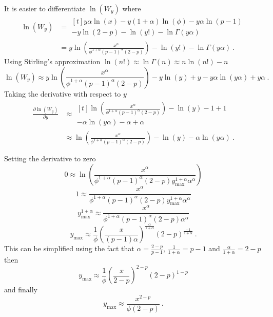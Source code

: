 It is easier to differentiate $\ln(W_y)$ where
\begin{align}
  \ln(W_y) &= 
  \begin{multlined}[t]
    y\alpha\ln(x)-y(1+\alpha)\ln(\phi)-y\alpha\ln(p-1)\\-y\ln(2-p)-\ln(y!)-\ln\Gamma(y\alpha)
  \end{multlined}
  \nonumber\\
  &=
  y
  \ln\left(
    \frac{x^\alpha}{\phi^{1+\alpha}(p-1)^\alpha(2-p)}
  \right)
  -\ln(y!)-\ln\Gamma(y\alpha)
  \ .
\end{align}
Using Stirling's approximation $\ln(n!)\approx\ln\Gamma(n)\approx n\ln(n!)-n$
\begin{equation}
  \ln(W_y) \approx
  y\ln\left(
    \frac{x^\alpha}{\phi^{1+\alpha}(p-1)^\alpha(2-p)}
  \right)
  -y\ln(y)+y-y\alpha\ln(y\alpha) + y\alpha
  \ .
\end{equation}
Taking the derivative with respect to $y$
\begin{align*}
  \frac{\partial \ln(W_y)}{\partial y} &\approx
  \begin{multlined}[t]
    \ln\left(
      \frac{x^\alpha}{\phi^{1+\alpha}(p-1)^\alpha(2-p)}
    \right)
    -\ln(y)-1+1
    \\
    -\alpha\ln(y\alpha)-\alpha+\alpha
  \end{multlined}
  \\
  &\approx
  \ln\left(
    \frac{x^\alpha}{\phi^{1+\alpha}(p-1)^\alpha(2-p)}
  \right)
  -\ln(y)
  -\alpha\ln(y\alpha)
  \ .
\end{align*}

Setting the derivative to zero
\begin{equation*}
  0 \approx \ln\left(
    \frac{
      x^\alpha
    }
    {
      \phi^{1+\alpha}(p-1)^\alpha(2-p)y_{\text{max}}^{1+\alpha}\alpha^\alpha
    }
  \right)
\end{equation*}
\begin{equation*}
  1 \approx 
  \frac{x^\alpha}{\phi^{1+\alpha}(p-1)^\alpha(2-p)y_{\text{max}}^{1+\alpha}\alpha^\alpha}
\end{equation*}
\begin{equation*}
  y_{\text{max}}^{1+\alpha} \approx 
  \frac{x^\alpha}{\phi^{1+\alpha}(p-1)^\alpha(2-p)\alpha^\alpha}
\end{equation*}
\begin{equation*}
  y_{\text{max}} \approx 
  \frac{1}{\phi}
  \left(
    \frac{x}{(p-1)\alpha}
  \right)^{\frac{\alpha}{1+\alpha}}
  (2-p)^{\frac{-1}{1+\alpha}}
  \ .
\end{equation*}
This can be simplified using the fact that $\alpha=\frac{2-p}{p-1}$, $\frac{1}{1+\alpha} = p-1$ and $\frac{\alpha}{1+\alpha} = 2-p$ then
\begin{equation*}
  y_{\text{max}} \approx 
  \frac{1}{\phi}
  \left(
    \frac{x}{2-p}
  \right)^{2-p}
  (2-p)^{1-p}
\end{equation*}
and finally
\begin{equation}
  y_{\text{max}} \approx \frac{x^{2-p}}{\phi(2-p)}
  \ .
\end{equation}

